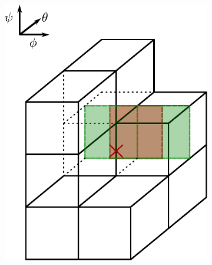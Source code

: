 \begin{figure}[H]
\begin{subfigure}[b]{0.24\textwidth}
		\includegraphics[width=1\textwidth]{schemes/BoundingBoxFluxThetaDiffPerp.pdf}
		\label{fig:StaggeredFluxTheta}
	\end{subfigure}
	\begin{subfigure}[b]{0.24\textwidth}
		\centering

\end{subfigure}
\end{figure}
